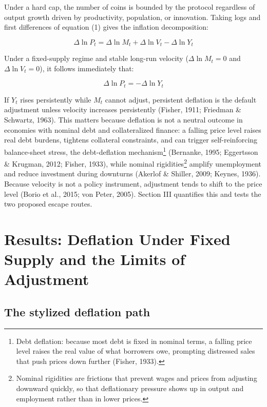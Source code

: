 \documentclass[12pt]{article}
\begin{document}
Under a hard cap, the number of coins is bounded by the protocol regardless of output growth driven by productivity, population, or innovation. Taking logs and first differences of equation (1) gives the inflation decomposition:

\begin{equation}
\Delta \ln P_{t} = \Delta \ln M_{t} + \Delta \ln V_{t} - \Delta \ln Y_{t}
\end{equation}

Under a fixed-supply regime and stable long-run velocity ($\Delta \ln M_{t} = 0$ and $\Delta \ln V_{t} = 0$), it follows immediately that:

\begin{equation}
\Delta \ln P_{t} = - \Delta \ln Y_{t}
\end{equation}

If $Y_{t}$ rises persistently while $M_{t}$ cannot adjust, persistent deflation is the default adjustment unless velocity increases persistently (Fisher, 1911; Friedman \& Schwartz, 1963). This matters because deflation is not a neutral outcome in economies with nominal debt and collateralized finance: a falling price level raises real debt burdens, tightens collateral constraints, and can trigger self-reinforcing balance-sheet stress, the debt-deflation mechanism\footnote{Debt deflation: because most debt is fixed in nominal terms, a falling price level raises the real value of what borrowers owe, prompting distressed sales that push prices down further (Fisher, 1933).} (Bernanke, 1995; Eggertsson \& Krugman, 2012; Fisher, 1933), while nominal rigidities\footnote{Nominal rigidities are frictions that prevent wages and prices from adjusting downward quickly, so that deflationary pressure shows up in output and employment rather than in lower prices.} amplify unemployment and reduce investment during downturns (Akerlof \& Shiller, 2009; Keynes, 1936). Because velocity is not a policy instrument, adjustment tends to shift to the price level (Borio et al., 2015; von Peter, 2005). Section III quantifies this and tests the two proposed escape routes.

\section{Results: Deflation Under Fixed Supply and the Limits of Adjustment}

\subsection{The stylized deflation path}
\end{document}
